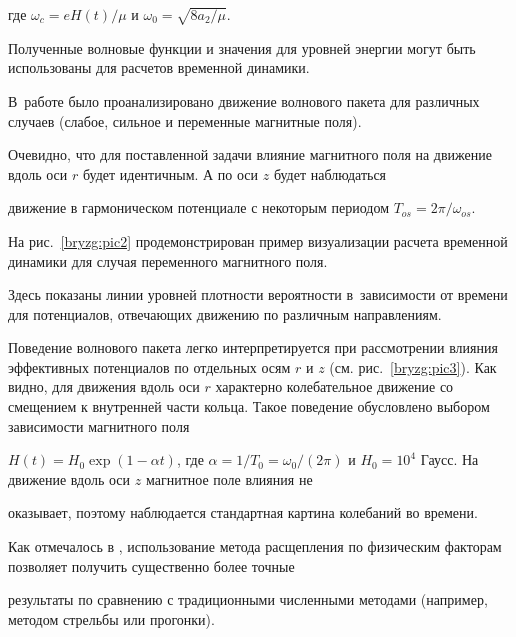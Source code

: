 где $\omega_c = eH(t)/\mu$ и $\omega_0 = \sqrt{8a_2/\mu}$.



\smallskip



 Полученные волновые функции и значения для уровней энергии могут быть использованы для расчетов временной динамики. 

В~работе \cite{Bryzgalov2} было проанализировано движение волнового пакета для различных случаев (слабое, сильное и переменные магнитные поля).

Очевидно, что для поставленной задачи влияние магнитного поля на движение вдоль оси $r$ будет идентичным. А по оси $z$ будет наблюдаться

движение в гармоническом потенциале с некоторым периодом $T_{os}=2\pi/\omega_{os}$.



На рис.~\ref{bryzg:pic2} продемонстрирован пример визуализации расчета временной динамики для случая переменного магнитного поля. 

Здесь показаны линии уровней плотности вероятности в~зависимости от времени для потенциалов, отвечающих движению по различным направлениям.

Поведение волнового пакета легко интерпретируется при рассмотрении влияния эффективных потенциалов по отдельных осям $r$ и $z$ (см. рис.~\ref{bryzg:pic3}). Как видно, для движения вдоль оси $r$ характерно колебательное движение со смещением к внутренней части кольца. Такое поведение обусловлено выбором зависимости магнитного поля

$H(t)=H_0\exp(1-\alpha t)$, где $\alpha = 1/T_0= \omega_0/(2\pi)$ и $H_0 = 10^4$ Гаусс. На движение вдоль оси $z$ магнитное поле влияния не

оказывает, поэтому наблюдается стандартная картина колебаний во времени.









Как отмечалось в \cite{Bryzgalov1}, использование метода расщепления по физическим факторам позволяет получить существенно более точные

результаты по сравнению с традиционными численными методами (например, методом стрельбы или прогонки).



\clearpage 

